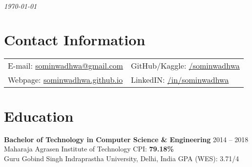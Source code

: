 \documentclass[margin,line]{res}
\begin{document}
 \hfill {\em \today}

\begin{resume}
\section{\sc Contact Information}

\vspace{.025in}
\begin{tabular}{@{}p{3.5in}p{3in}}
{E-mail:}  \href{mailto:sominwadhwa@gmail.com}{sominwadhwa@gmail.com} & {GitHub/Kaggle:} {\href{https://github.com/sominwadhwa}{\underline{/sominwadhwa}}}\\
{Webpage:} {\href{https://sominwadhwa.github.io}{sominwadhwa.github.io}} & {LinkedIN:} {\href{https://www.linkedin.com/in/sominwadhwa/}{\underline{/in/sominwadhwa}}}\\
\end{tabular}

\section{\sc Education}
{\bf Bachelor of Technology in Computer Science \& Engineering} \hfill 2014 -- 2018\\
Maharaja Agrasen Institute of Technology \hfill CPI: {\bf 79.18\%}\\
Guru Gobind Singh Indraprastha University, Delhi, India \hfill GPA (WES): 3.71/4


\end{resume}
\end{document}

